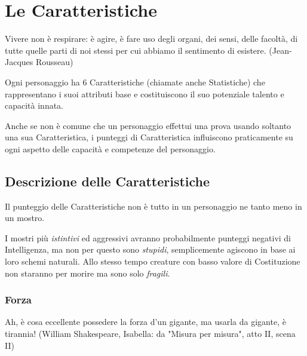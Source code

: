\section{Le Caratteristiche}


\begin{changemargin}{0.3cm}{0.3cm}\begin{enfasi}{
Vivere non è respirare: è agire, è fare uso degli organi, dei sensi, delle facoltà, di tutte quelle parti di noi stessi per cui abbiamo il sentimento di esistere. (Jean-Jacques Rousseau)
}\end{enfasi}\end{changemargin}\medskip

\begin{multicols}{2}

Ogni personaggio ha 6 Caratteristiche (chiamate anche Statistiche) che rappresentano i suoi attributi base e costituiscono il suo potenziale talento e capacità innata.

Anche se non è comune che un personaggio effettui una prova usando soltanto una sua Caratteristica, i punteggi di Caratteristica influiscono praticamente su ogni aspetto delle capacità e competenze del personaggio.


\subsection{Descrizione delle Caratteristiche}\label{decrizionedellecaratteristiche}

Il punteggio delle Caratteristiche non è tutto in un personaggio ne tanto meno in un mostro.

I mostri più \emph{istintivi} ed aggressivi avranno probabilmente punteggi negativi di Intelligenza, ma non per questo sono \emph{stupidi}, semplicemente agiscono in base ai loro schemi naturali. Allo stesso tempo creature con basso valore di Costituzione non staranno per morire ma sono solo \emph{fragili}.

\subsubsection{Forza}\label{forza}

\begin{changemargin}{0.3cm}{0.3cm}\begin{enfasi}{
Ah, è cosa eccellente possedere la forza d'un gigante, ma usarla da gigante, è tirannia! (William Shakespeare, Isabella: da "Misura per misura", atto II, scena II)
}\end{enfasi}\end{changemargin}


\end{multicols}
